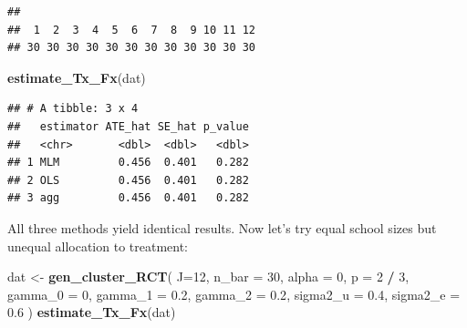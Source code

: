\documentclass[
]{book}
\newenvironment{Shaded}{\begin{snugshade}}{\end{snugshade}}
\newcommand{\AttributeTok}[1]{\textcolor[rgb]{0.13,0.29,0.53}{#1}}
\newcommand{\CommentTok}[1]{\textcolor[rgb]{0.56,0.35,0.01}{\textit{#1}}}
\newcommand{\DecValTok}[1]{\textcolor[rgb]{0.00,0.00,0.81}{#1}}
\newcommand{\FloatTok}[1]{\textcolor[rgb]{0.00,0.00,0.81}{#1}}
\newcommand{\FunctionTok}[1]{\textcolor[rgb]{0.13,0.29,0.53}{\textbf{#1}}}
\newcommand{\NormalTok}[1]{#1}
\newcommand{\OtherTok}[1]{\textcolor[rgb]{0.56,0.35,0.01}{#1}}
\newcommand{\SpecialCharTok}[1]{\textcolor[rgb]{0.81,0.36,0.00}{\textbf{#1}}}
\begin{document}
\begin{Shaded}
\end{Shaded}

\begin{verbatim}
## 
##  1  2  3  4  5  6  7  8  9 10 11 12 
## 30 30 30 30 30 30 30 30 30 30 30 30
\end{verbatim}

\begin{Shaded}
\begin{Highlighting}[]
\FunctionTok{estimate\_Tx\_Fx}\NormalTok{(dat)}
\end{Highlighting}
\end{Shaded}

\begin{verbatim}
## # A tibble: 3 x 4
##   estimator ATE_hat SE_hat p_value
##   <chr>       <dbl>  <dbl>   <dbl>
## 1 MLM         0.456  0.401   0.282
## 2 OLS         0.456  0.401   0.282
## 3 agg         0.456  0.401   0.282
\end{verbatim}

All three methods yield identical results.
Now let's try equal school sizes but unequal allocation to treatment:

\begin{Shaded}
\begin{Highlighting}[]
\NormalTok{dat }\OtherTok{\textless{}{-}} \FunctionTok{gen\_cluster\_RCT}\NormalTok{( }
  \AttributeTok{J=}\DecValTok{12}\NormalTok{, }\AttributeTok{n\_bar =} \DecValTok{30}\NormalTok{, }\AttributeTok{alpha =} \DecValTok{0}\NormalTok{, }\AttributeTok{p =} \DecValTok{2} \SpecialCharTok{/} \DecValTok{3}\NormalTok{, }
  \AttributeTok{gamma\_0 =} \DecValTok{0}\NormalTok{, }\AttributeTok{gamma\_1 =} \FloatTok{0.2}\NormalTok{, }\AttributeTok{gamma\_2 =} \FloatTok{0.2}\NormalTok{,}
  \AttributeTok{sigma2\_u =} \FloatTok{0.4}\NormalTok{, }\AttributeTok{sigma2\_e =} \FloatTok{0.6}
\NormalTok{)}
\FunctionTok{estimate\_Tx\_Fx}\NormalTok{(dat)}
\end{Highlighting}
\end{Shaded}
\end{document}
